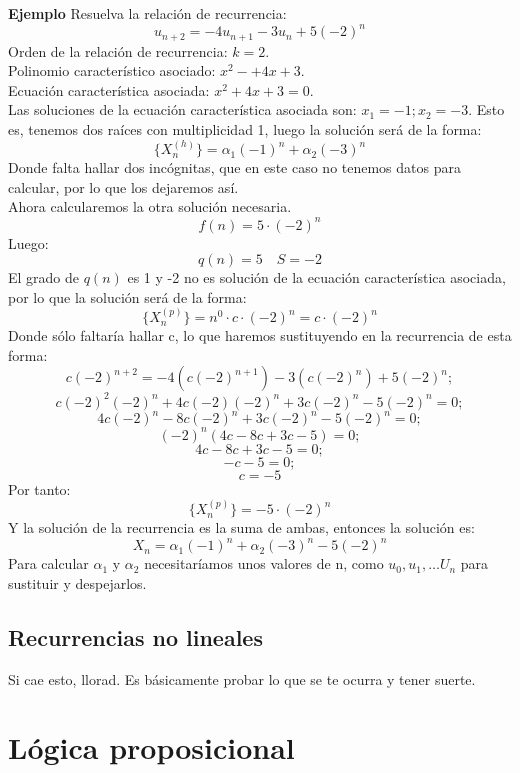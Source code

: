 \documentclass[a4paper]{article}
\theoremstyle{plain} \newtheorem{PrimerPrincipio}{Teorema}
\theoremstyle{plain} \newtheorem{SegundoPrincipio}{Teorema}
\begin{document}
\large{\textbf{Ejemplo}}
Resuelva la relación de recurrencia:
$$u_{n+2}=-4u_{n+1}-3u_n+5(-2)^n$$
Orden de la relación de recurrencia: $k=2$.\\
Polinomio característico asociado: $x^2-+4x+3$.\\
Ecuación característica asociada: $x^2+4x+3=0$.\\
Las soluciones de la ecuación característica asociada son: $x_1= -1; x_2=-3$. Esto es, tenemos dos raíces con multiplicidad 1, luego la solución será de la forma:
$$\{X_n^{(h)}\}=\alpha_1(-1)^n+\alpha_2(-3)^n$$
Donde falta hallar dos incógnitas, que en este caso no tenemos datos para calcular, por lo que los dejaremos así.\\
Ahora calcularemos la otra solución necesaria.
$$f(n)=5\cdot (-2)^n$$
Luego:
$$q(n)= 5 \quad S=-2$$
El grado de $q(n)$ es 1 y -2 no es solución de la ecuación característica asociada, por lo que la solución será de la forma:
$$\{X_n^{(p)}\}=n^0\cdot c\cdot (-2)^n=c\cdot (-2)^n$$
Donde sólo faltaría hallar c, lo que haremos sustituyendo en la recurrencia de esta forma:
$$c(-2)^{n+2}=-4(c(-2)^{n+1})-3(c(-2)^n)+5(-2)^n;$$
$$c(-2)^2(-2)^n+4c(-2)(-2)^n+3c(-2)^n-5(-2)^n=0;$$
$$4c(-2)^n-8c(-2)^n+3c(-2)^n-5(-2)^n=0;$$
$$(-2)^n(4c-8c+3c-5)=0;$$
$$4c-8c+3c-5=0;$$
$$-c-5=0;$$
$$c=-5$$
Por tanto:
$$\{X_n^{(p)}\}=-5\cdot (-2)^n$$
Y la solución de la recurrencia es la suma de ambas, entonces la solución es:
$$X_n=\alpha_1(-1)^n+\alpha_2(-3)^n-5(-2)^n$$
Para calcular $\alpha_1$ y $\alpha_2$ necesitaríamos unos valores de n, como $u_0, u_1,\ldots U_n$ para sustituir y despejarlos.

\subsection{Recurrencias no lineales}
Si cae esto, llorad. Es básicamente probar lo que se te ocurra y tener suerte.




\section{Lógica proposicional}
\end{document}
